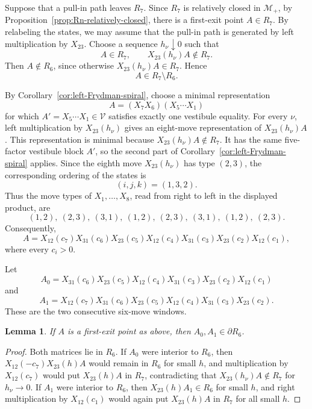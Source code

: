 \documentclass[11pt,onecolumn]{amsart}
\theoremstyle{plain}
\newtheorem{lemma}[theorem]{Lemma}
\theoremstyle{definition}
\theoremstyle{remark}
\newcommand{\V}{\mathcal V}
\begin{document}
Suppose that a pull-in path leaves $R_7$. Since $R_7$ is relatively closed
in $\mathcal M_+$, by Proposition~\ref{prop:Rn-relatively-closed}, there
is a first-exit point $A\in R_7$.
By relabeling the states, we
may assume that the pull-in path is generated by left multiplication by
$X_{23}$. Choose a sequence
$h_\nu\downarrow0$ such that
\[
A\in R_7,
\qquad
X_{23}(h_\nu)A\notin R_7.
\]
Then $A\notin R_6$, since otherwise
$X_{23}(h_\nu)A\in R_7$. Hence
\[
A\in R_7\setminus R_6.
\]

By Corollary~\ref{cor:left-Frydman-spiral}, choose a minimal
representation
\[
A=(X_7X_6)(X_5\cdots X_1)
\]
for which $A'=X_5\cdots X_1\in\V$ satisfies exactly one vestibule
equality. For every $\nu$, left multiplication by $X_{23}(h_\nu)$ gives an
eight-move representation of $X_{23}(h_\nu)A$. This representation is
minimal because $X_{23}(h_\nu)A\notin R_7$. It has the same
five-factor vestibule block $A'$, so the second part of
Corollary~\ref{cor:left-Frydman-spiral} applies.
Since the eighth move $X_{23}(h_\nu)$ has type $(2,3)$, the corresponding ordering
of the states is
\[
(i,j,k)=(1,3,2).
\]
Thus the move types of $X_1,\ldots,X_8$, read from right to left in the
displayed product, are
\[
(1,2),\ (2,3),\ (3,1),\ (1,2),\
(2,3),\ (3,1),\ (1,2),\ (2,3).
\]
Consequently,
\[
A=X_{12}(c_7)X_{31}(c_6)X_{23}(c_5)
X_{12}(c_4)X_{31}(c_3)X_{23}(c_2)X_{12}(c_1),
\]
where every $c_i>0$.




Let
\[
A_0=X_{31}(c_6)X_{23}(c_5)X_{12}(c_4)
    X_{31}(c_3)X_{23}(c_2)X_{12}(c_1)
\]
and
\[
A_1=X_{12}(c_7)X_{31}(c_6)X_{23}(c_5)
    X_{12}(c_4)X_{31}(c_3)X_{23}(c_2).
\]
These are the two consecutive six-move windows.

\begin{lemma}
\label{lem:two-R6-boundary-windows}
If $A$ is a first-exit point as above, then
$A_0,A_1\in\partial R_6$.
\end{lemma}

\begin{proof}
Both matrices lie in $R_6$.  If $A_0$ were interior to $R_6$, then
$X_{12}(-c_7)X_{23}(h)A$ would remain in $R_6$ for small $h$, and
multiplication by $X_{12}(c_7)$ would put $X_{23}(h)A$ in $R_7$, contradicting that
$X_{23}(h_\nu)A\notin R_7$ for $h_\nu\to 0$.  If
$A_1$ were interior to $R_6$, then $X_{23}(h)A_1\in R_6$ for small $h$, and
right multiplication by $X_{12}(c_1)$ would again put
$X_{23}(h)A$ in $R_7$ for all small $h$. 
\end{proof}
\end{document}
